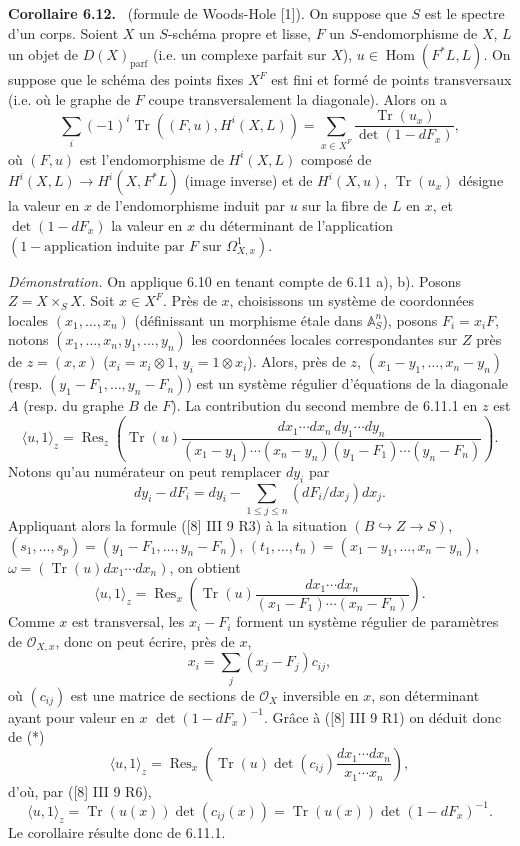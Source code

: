 \documentclass[11pt]{article}
\newenvironment{statement}[1]{\par\medskip\noindent\textbf{#1.}\ }{\par\medskip}
\DeclareMathOperator{\Hom}{Hom}
\providecommand{\OO}{\mathcal{O}}
\providecommand{\parf}{\mathrm{parf}}
\providecommand{\Hom}{\operatorname{Hom}}
\begin{document}
\begin{statement}{Corollaire 6.12}
(formule de Woods-Hole [1]). On suppose que $S$ est le spectre d'un corps. Soient $X$ un $S$-schéma propre et lisse, $F$ un $S$-endomorphisme de $X$, $L$ un objet de $D(X)_{\parf}$ (i.e. un complexe parfait sur $X$), $u\in\Hom(F^*L,L)$. On suppose que le schéma des points fixes $X^F$ est fini et formé de points transversaux (i.e. où le graphe de $F$ coupe transversalement la diagonale). Alors on a
\[
\sum_i(-1)^i\operatorname{Tr}((F,u),H^i(X,L))=
\sum_{x\in X^F}\frac{\operatorname{Tr}(u_x)}{\det(1-dF_x)},
\]
où $(F,u)$ est l'endomorphisme de $H^i(X,L)$ composé de $H^i(X,L)\to H^i(X,F^*L)$ (image inverse) et de $H^i(X,u)$, $\operatorname{Tr}(u_x)$ désigne la valeur en $x$ de l'endomorphisme induit par $u$ sur la fibre de $L$ en $x$, et $\det(1-dF_x)$ la valeur en $x$ du déterminant de l'application $(1-\text{application induite par }F\text{ sur }\Omega^1_{X,x})$.

\emph{Démonstration.} On applique 6.10 en tenant compte de 6.11 a), b). Posons $Z=X\times_S X$. Soit $x\in X^F$. Près de $x$, choisissons un système de coordonnées locales $(x_1,\ldots,x_n)$ (définissant un morphisme étale dans $\mathbb A_S^n$), posons $F_i=x_iF$, notons $(x_1,\ldots,x_n,y_1,\ldots,y_n)$ les coordonnées locales correspondantes sur $Z$ près de $z=(x,x)$ ($x_i=x_i\otimes1$, $y_i=1\otimes x_i$). Alors, près de $z$, $(x_1-y_1,\ldots,x_n-y_n)$ (resp. $(y_1-F_1,\ldots,y_n-F_n)$) est un système régulier d'équations de la diagonale $A$ (resp. du graphe $B$ de $F$). La contribution du second membre de 6.11.1 en $z$ est
\[
\langle u,1\rangle_z=
\operatorname{Res}_z\left(\operatorname{Tr}(u)\frac{dx_1\cdots dx_n\,dy_1\cdots dy_n}{(x_1-y_1)\cdots(x_n-y_n)(y_1-F_1)\cdots(y_n-F_n)}\right).
\]
Notons qu'au numérateur on peut remplacer $dy_i$ par
\[
dy_i-dF_i=dy_i-\sum_{1\le j\le n}(dF_i/dx_j)dx_j.
\]
Appliquant alors la formule ([8] III 9 R3) à la situation $(B\hookrightarrow Z\to S)$, $(s_1,\ldots,s_p)=(y_1-F_1,\ldots,y_n-F_n)$, $(t_1,\ldots,t_n)=(x_1-y_1,\ldots,x_n-y_n)$, $\omega=(\operatorname{Tr}(u)dx_1\cdots dx_n)$, on obtient
\begin{equation}
\tag{*}
\langle u,1\rangle_z=
\operatorname{Res}_x\left(\operatorname{Tr}(u)\frac{dx_1\cdots dx_n}{(x_1-F_1)\cdots(x_n-F_n)}\right).
\end{equation}
Comme $x$ est transversal, les $x_i-F_i$ forment un système régulier de paramètres de $\OO_{X,x}$, donc on peut écrire, près de $x$,
\[
x_i=\sum_j(x_j-F_j)c_{ij},
\]
où $(c_{ij})$ est une matrice de sections de $\OO_X$ inversible en $x$, son déterminant ayant pour valeur en $x$ $\det(1-dF_x)^{-1}$. Grâce à ([8] III 9 R1) on déduit donc de (*)
\[
\langle u,1\rangle_z=\operatorname{Res}_x\left(\operatorname{Tr}(u)\det(c_{ij})\frac{dx_1\cdots dx_n}{x_1\cdots x_n}\right),
\]
d'où, par ([8] III 9 R6),
\[
\langle u,1\rangle_z=\operatorname{Tr}(u(x))\det(c_{ij}(x))=\operatorname{Tr}(u(x))\det(1-dF_x)^{-1}.
\]
Le corollaire résulte donc de 6.11.1.
\end{statement}
\end{document}

